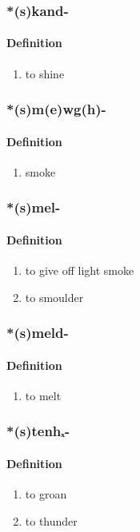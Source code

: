 \subsubsection{\**(s)kand-}
\paragraph{Definition}
\begin{enumerate}
\item to shine
\end{enumerate}
\subsubsection{\**(s)m(e)wg(h)-}
\paragraph{Definition}
\begin{enumerate}
\item smoke
\end{enumerate}
\subsubsection{\**(s)mel-}
\paragraph{Definition}
\begin{enumerate}
\item to give off light smoke
\item to smoulder
\end{enumerate}
\subsubsection{\**(s)meld-}
\paragraph{Definition}
\begin{enumerate}
\item to melt
\end{enumerate}
\subsubsection{\**(s)tenhₓ-}
\paragraph{Definition}
\begin{enumerate}
\item to groan
\item to thunder
\end{enumerate}
